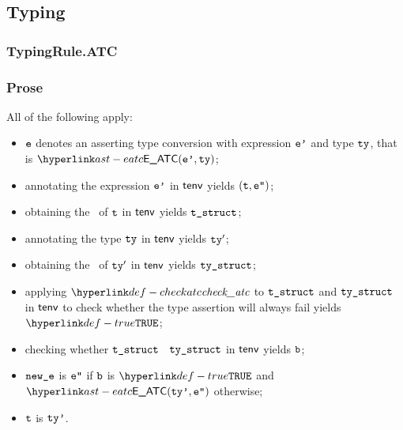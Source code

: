 \begin{mathpar}
\end{mathpar}

\subsection{Typing}
\subsubsection{TypingRule.ATC\label{sec:TypingRule.ATC}}
\subsubsection{Prose}
All of the following apply:
\begin{itemize}
  \item $\ve$ denotes an asserting type conversion with expression $\vep$ and type $\tty$, that is $\EATC(\vep, \tty)$;
  \item annotating the expression $\vep$ in $\tenv$ yields $(\vt, \vepp)$\ProseOrTypeError;
  \item obtaining the \structure\ of $\vt$ in $\tenv$ yields $\vtstruct$\ProseOrTypeError;
  \item annotating the type $\tty$ in $\tenv$ yields $\tty'$\ProseOrTypeError;
  \item obtaining the \structure\ of $\tty'$ in $\tenv$ yields $\vtystruct$\ProseOrTypeError;
  \item applying $\checkatc$ to $\vtstruct$ and $\vtystruct$ in $\tenv$ to check whether the type assertion
        will always fail yields $\True$\ProseOrTypeError;
  \item checking whether $\vtstruct$ \subtypesatisfies\ $\vtystruct$ in $\tenv$ yields $\vb$\ProseOrTypeError;
  \item $\newe$ is $\vepp$ if $\vb$ is $\True$ and $\EATC(\ttyp, \vepp)$ otherwise;
  \item $\vt$ is $\ttyp$.
\end{itemize}
